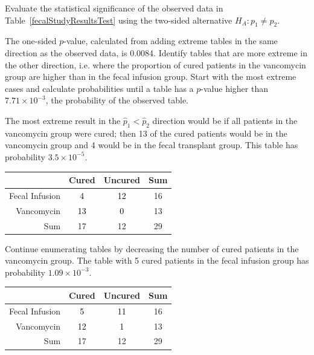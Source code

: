 \begin{example}{Evaluate the statistical significance of the observed data in Table~\ref{fecalStudyResultsTest} using the two-sided alternative $H_A: p_1 \neq p_2$.}
	
The one-sided $p$-value, calculated from adding extreme tables in the same direction as the observed data, is 0.0084. Identify tables that are more extreme in the other direction, i.e. where the proportion of cured patients in the vancomycin group are higher than in the fecal infusion group. Start with the most extreme cases and calculate probabilities until a table has a $p$-value higher than $7.71 \times 10^{-3}$, the probability of the observed table. 

The most extreme result in the $\hat{p}_1 < \hat{p}_2$ direction would be if all patients in the vancomycin group were cured; then 13 of the cured patients would be in the vancomycin group and 4 would be in the fecal transplant group. This table has probability $3.5 \times 10^{-5}$.

\begin{table}[h]
	\centering
	\color{gray}
	\begin{tabular}{r|cc|c}
		\hline
		& Cured & Uncured & Sum \\ 
		\hline
		Fecal Infusion & \textcolor{black}{4} & \textcolor{black}{12} & 16 \\ 
		Vancomycin & \textcolor{black}{13} & \textcolor{black}{0} & 13 \\ 
		\hline
		Sum & 17 & 12 & 29 \\ 
		\hline
	\end{tabular}
\end{table}

Continue enumerating tables by decreasing the number of cured patients in the vancomycin group. The table with 5 cured patients in the fecal infusion group has probability $1.09 \times 10^{-3}$.

\begin{table}[h]
	\centering
	\color{gray}
	\begin{tabular}{r|cc|c}
		\hline
		& Cured & Uncured & Sum \\ 
		\hline
		Fecal Infusion & \textcolor{black}{5} & \textcolor{black}{11} & 16 \\ 
		Vancomycin & \textcolor{black}{12} & \textcolor{black}{1} & 13 \\ 
		\hline
		Sum & 17 & 12 & 29 \\ 
		\hline
	\end{tabular}
\end{table}


\end{example}
